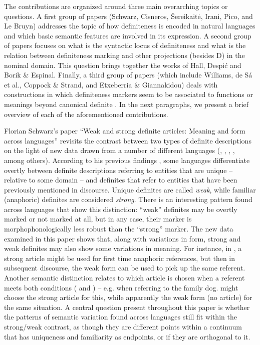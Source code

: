 \documentclass[output=paper]{langsci/langscibook}
\begin{document}
The contributions are organized around three main overarching topics or questions. A first group of papers (Schwarz, Cisneros, Šereikaitė, Irani, Pico, and Le Bruyn) addresses the topic of how definiteness is encoded in natural languages and which basic semantic features are involved in its expression. A second group of papers focuses on what is the syntactic locus of definiteness and what is the relation between definiteness marking and other projections (besides D) in the nominal domain. This question brings together the works of Hall, Despić and Borik \& Espinal.  Finally, a third group of papers (which include Williams, de Sá et al., Coppock \& Strand, and Etxeberria \& Giannakidou) deals with constructions in which definiteness markers seem to be associated to functions or meanings beyond canonical definite . In the next paragraphs, we present a brief overview of each of the aforementioned contributions.

Florian Schwarz’s paper “Weak and strong definite articles: Meaning and form across languages” revisits the contrast between two types of definite descriptions on the light of new data drawn from a number of different languages (, , , , among others). According to his previous findings \citep{Schwarz2009}, some languages differentiate overtly between definite descriptions referring to entities that are unique -- relative to some domain -- and definites that refer to entities that have been previously mentioned in discourse. Unique definites are called \textit{weak}, while familiar (anaphoric) definites are considered \textit{strong}. There is an interesting pattern found across languages that show this distinction: “weak” definites may be overtly marked or not marked at all, but in any case, their marker is morphophonologically less robust than the “strong” marker. The new data examined in this paper shows that, along with variations in form, strong and weak definites may also show some variations in meaning. For instance, in , a strong article might be used for first time anaphoric references, but then in subsequent discourse, the weak form can be used to pick up the same referent. Another semantic distinction relates to which article is chosen when a referent meets both conditions ( and ) -- e.g. when referring to the family dog.  might choose the strong article for this, while  apparently the weak form (no article) for the same situation. A central question present throughout this paper is whether the patterns of semantic variation found across languages still fit within the strong/weak contrast, as though they are different points within a continuum that has uniqueness and familiarity as endpoints, or if they are orthogonal to it. 
\end{document}
